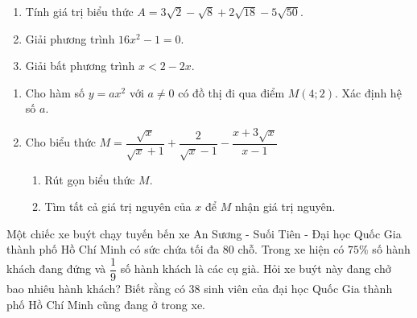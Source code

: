 \setcounter{deso}{1}
\begin{name}
	{\tenchude}
	{\tendethi}
	{\tentruong}
	{\thoigian}
\end{name}
\begin{bt}[1,5 điểm]
\begin{enumerate}[1.]
    \item Tính giá trị biểu thức $A=3\sqrt{2}-\sqrt{8}+2\sqrt{18}-5\sqrt{50}$.
    \item Giải phương trình $16x^2-1=0$.
    \item Giải bất phương trình $x<2-2x$.
\end{enumerate}
\end{bt}

\begin{bt}[2,0 điểm]
\begin{enumerate}[1.]
    \item Cho hàm số $y=ax^2$ với $a \ne 0$ có đồ thị đi qua điểm $M(4;2)$. Xác định hệ số $a$.
    \item Cho biểu thức $M=\dfrac{\sqrt{x}}{\sqrt{x}+1}+\dfrac{2}{\sqrt{x}-1}-\dfrac{x+3\sqrt{x}}{x-1}$
    \begin{enumerate}
        \item Rút gọn biểu thức $M$.
        \item Tìm tất cả giá trị nguyên của $x$ để $M$ nhận giá trị nguyên.
    \end{enumerate}
\end{enumerate}
\end{bt}

\begin{bt}[1,5 điểm]%
Một chiếc xe buýt chạy tuyến bến xe An Sương - Suối Tiên - Đại học Quốc Gia thành phố Hồ Chí
Minh có sức chứa tối đa $80$ chỗ. Trong xe hiện có $75 \%$ số hành khách đang đứng và $\dfrac{1}{9}$ số hành khách là các cụ già. Hỏi xe buýt này đang chở bao nhiêu hành khách? Biết rằng có $38$ sinh viên của đại học Quốc Gia thành phố Hồ Chí Minh cũng đang ở trong xe.
\end{bt}

